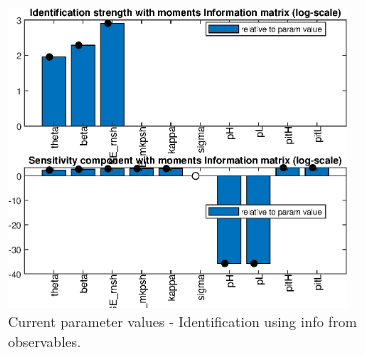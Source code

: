 
\begin{figure}[H]
\centering 
\includegraphics[width=0.8\textwidth]{MS/identification/MS_ident_strength_Current_params}
\caption{Current parameter values  - Identification using info from observables.}\label{Fig:ident:Current_params}
\end{figure}

